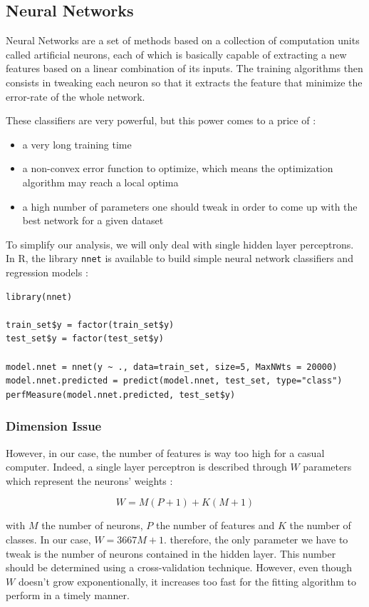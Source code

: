 \documentclass[]{report}
\begin{document}
\pagebreak

\subsection{Neural Networks}

Neural Networks are a set of methods based on a collection of computation units called artificial neurons, each of which is basically capable of extracting a new features based on a linear combination of its inputs. The training algorithms then consists in tweaking each neuron so that it extracts the feature that minimize the error-rate of the whole network.

These classifiers are very powerful, but this power comes to a price of : 
\begin{itemize}
	\item a very long training time
	\item a non-convex error function to optimize, which means the optimization algorithm may reach a local optima
	\item a high number of parameters one should tweak in order to come up with the best network for a given dataset
\end{itemize}

To simplify our analysis, we will only deal with single hidden layer perceptrons. In R, the library \texttt{nnet} is available to build simple neural network classifiers and regression models : 
\begin{lstlisting}
library(nnet)

train_set$y = factor(train_set$y)
test_set$y = factor(test_set$y)

model.nnet = nnet(y ~ ., data=train_set, size=5, MaxNWts = 20000)
model.nnet.predicted = predict(model.nnet, test_set, type="class")
perfMeasure(model.nnet.predicted, test_set$y)
\end{lstlisting}

\subsubsection{Dimension Issue}

However, in our case, the number of features is way too high for a casual computer. Indeed, a single layer perceptron is described through $W$ parameters which represent the neurons' weights : 

$$
	W = M(P+1) + K(M+1)
$$

with $M$ the number of neurons, $P$ the number of features and $K$ the number of classes. In our case, $W = 3667M + 1$.
 therefore, the only parameter we have to tweak is the number of neurons contained in the hidden layer. This number should be determined using a cross-validation technique. However, even though $W$ doesn't grow exponentionally, it increases too fast for the fitting algorithm to perform in a timely manner. 
 
\end{document}
